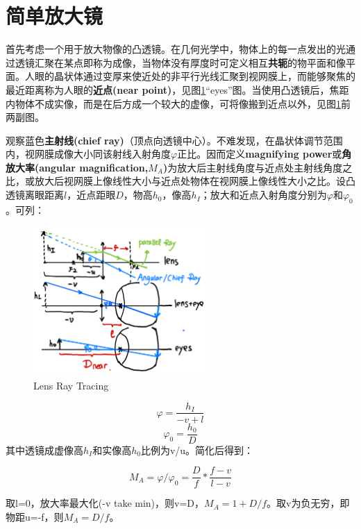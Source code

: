 \documentclass[12pt]{ctexart}%
\begin{document}
\section*{简单放大镜}
首先考虑一个用于放大物像的凸透镜。在几何光学中，物体上的每一点发出的光通过透镜汇聚在某点即称为成像，当物体没有厚度时可定义相互\textbf{共轭}的物平面和像平面。人眼的晶状体通过变厚来使近处的非平行光线汇聚到视网膜上，而能够聚焦的最近距离称为人眼的\textbf{近点(near point)}，见图\ref{single_lens_2}“eyes”图。当使用凸透镜后，焦距内物体不成实像，而是在后方成一个较大的虚像，可将像搬到近点以外，见图\ref{single_lens_2}前两副图。
\par 观察蓝色\textbf{主射线(chief ray)}（顶点向透镜中心）。不难发现，在晶状体调节范围内，视网膜成像大小同该射线入射角度$\varphi$正比。因而定义\textbf{magnifying power}或\textbf{角放大率(angular magnification,$M_A$)}为放大后主射线角度与近点处主射线角度之比，或放大后视网膜上像线性大小与近点处物体在视网膜上像线性大小之比。设凸透镜离眼距离$l$，近点距眼$D$，物高$h_0$，像高$h_I$；放大和近点入射角度分别为$\varphi$和$\varphi_0$。可列：
\begin{figure}[t] %
    \centering
    \includegraphics[width=0.6\textwidth]{Image/2_lens_ray.jpg}
    \caption{Lens Ray Tracing}
    \label{single_lens_2}
\end{figure}

\begin{equation}
    \varphi=\frac{h_I}{-v+l}
\end{equation}
\begin{equation}
    \varphi_0=\frac{h_0}{D}
\end{equation}
其中透镜成虚像高$h_I$和实像高$h_0$比例为v/u。简化后得到：
\begin{framed}
    \begin{equation}
        M_{A}=\varphi/\varphi_0=\frac{D}{f}*\frac{f-v}{l-v}
    \end{equation}
\end{framed}
\noindent 取l=0，放大率最大化(-v take min)，则v=D，$M_A=1+D/f$。取v为负无穷，即物距u=-f，则$M_A=D/f$。
\end{document}
